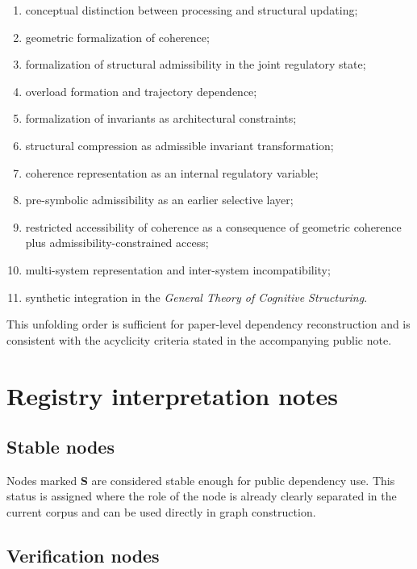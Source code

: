 \documentclass[11pt,a4paper]{article}
\begin{document}
	\begin{enumerate}[leftmargin=2em]
		\item conceptual distinction between processing and structural updating;
		\item geometric formalization of coherence;
		\item formalization of structural admissibility in the joint regulatory state;
		\item overload formation and trajectory dependence;
		\item formalization of invariants as architectural constraints;
		\item structural compression as admissible invariant transformation;
		\item coherence representation as an internal regulatory variable;
		\item pre-symbolic admissibility as an earlier selective layer;
		\item restricted accessibility of coherence as a consequence of geometric coherence plus admissibility-constrained access;
		\item multi-system representation and inter-system incompatibility;
		\item synthetic integration in the \emph{General Theory of Cognitive Structuring}.
	\end{enumerate}
	
	This unfolding order is sufficient for paper-level dependency reconstruction and is consistent with
	the acyclicity criteria stated in the accompanying public note.
	
	\section{Registry interpretation notes}
	
	\subsection{Stable nodes}
	
	Nodes marked \textbf{S} are considered stable enough for public dependency use. This status is
	assigned where the role of the node is already clearly separated in the current corpus and can
	be used directly in graph construction.
	
	\subsection{Verification nodes}
	
\end{document}
